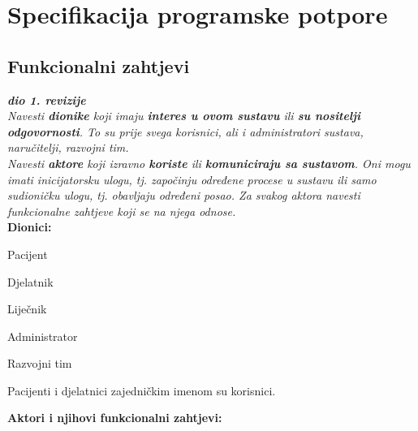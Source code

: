 \chapter{Specifikacija programske potpore}
		
	\section{Funkcionalni zahtjevi}
			
			\textbf{\textit{dio 1. revizije}}\\
			
			\textit{Navesti \textbf{dionike} koji imaju \textbf{interes u ovom sustavu} ili  \textbf{su nositelji odgovornosti}. To su prije svega korisnici, ali i administratori sustava, naručitelji, razvojni tim.}\\
				
			\textit{Navesti \textbf{aktore} koji izravno \textbf{koriste} ili \textbf{komuniciraju sa sustavom}. Oni mogu imati inicijatorsku ulogu, tj. započinju određene procese u sustavu ili samo sudioničku ulogu, tj. obavljaju određeni posao. Za svakog aktora navesti funkcionalne zahtjeve koji se na njega odnose.}\\
			
			
			\noindent \textbf{Dionici:}
			
			\begin{packed_enum}
				
				\item Pacijent
				\item Djelatnik	
				\begin{packed_item}
					\item Liječnik
					\item Administrator
				\end{packed_item}
				\item Razvojni tim
				
			\end{packed_enum}
			
			Pacijenti i djelatnici zajedničkim imenom su korisnici.
			
			
			\noindent \textbf{Aktori i njihovi funkcionalni zahtjevi:}
			
